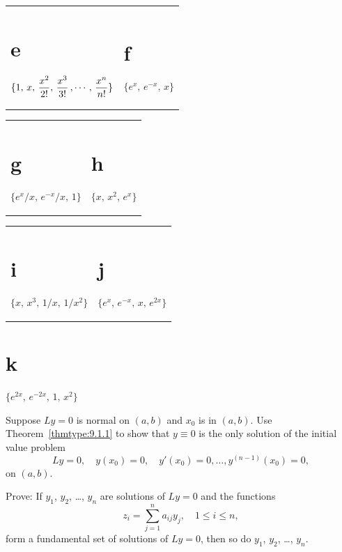 \begin{exerciselist}
  \begin{tabular}[t]{@{}p{168pt}@{}p{168pt}}
    \part{e} $\displaystyle{\{1,\,x,\,\frac{x^{2}}{2!},\, \frac{x^{3}}{3!}\,,\cdots,\,\frac{x^{n}}{n!}}\}$ & \part{f} $\{e^{x},\,e^{-x},\,x\}$
  \end{tabular}

  \begin{tabular}[t]{@{}p{168pt}@{}p{168pt}}
    \part{g} $\{e^{x}/x,\,e^{-x}/x,\,1\}$ & \part{h} $\{x,\,x^{2},\,e^{x}\}$
  \end{tabular}

  \begin{tabular}[t]{@{}p{168pt}@{}p{168pt}}
    \part{i} $\{x,\,x^{3},\,1/x,\,1/x^{2}\}$ & \part{j} $\{e^{x},\,e^{-x},\,x,\,e^{2x}\}$
  \end{tabular}

\part{k} $\{e^{2x},\,e^{-2x},\,1,\,x^{2}\}$

  \item\label{exer:9.1.11} Suppose $Ly=0$ is normal on $(a,b)$ and $x_{0}$ is in $(a,b)$. Use
        Theorem~\ref{thmtype:9.1.1} to show that $y\equiv0$ is the only solution of the initial
        value problem
  \[
    Ly=0,\quad y(x_{0})=0,\quad y'(x_{0})=0,\dots,y^{(n-1)}(x_{0})=0,
  \]
  on $(a,b)$.

  \item\label{exer:9.1.12} Prove: If $y_{1}$, $y_{2}$, \dots, $y_{n}$ are solutions of $Ly=0$ and
        the functions
  \[
    z_{i}=\sum^{n}_{j=1}a_{ij}y_{j},\quad1\le i\le n,
  \]
  form a fundamental set of solutions of $Ly=0$, then so do $y_{1}$, $y_{2}$, \dots, $y_{n}$.


\end{exerciselist}
